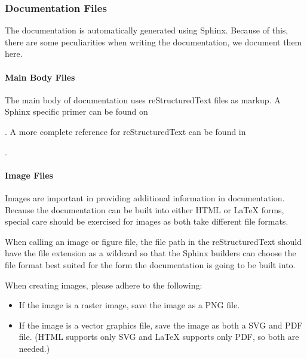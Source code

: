 \documentclass[letterpaper,11pt,english]{sphinxmanual}
\begin{document}
\subsubsection{Documentation Files}
\label{\detokenize{technical/conventions:documentation-files}}
\sphinxAtStartPar
The documentation is automatically generated using Sphinx. Because of this,
there are some peculiarities when writing the documentation, we document them
here.


\paragraph{Main Body Files}
\label{\detokenize{technical/conventions:main-body-files}}
\sphinxAtStartPar
The main body of documentation uses reStructuredText files as markup. A
Sphinx specific primer can be found on
%
\begin{footnote}[64]\sphinxAtStartFootnote
{}
%
\end{footnote}. A more complete reference for reStructuredText can be found in
%
\begin{footnote}[65]\sphinxAtStartFootnote
{}
%
\end{footnote}.


\paragraph{Image Files}
\label{\detokenize{technical/conventions:image-files}}
\sphinxAtStartPar
Images are important in providing additional information in documentation.
Because the documentation can be built into either HTML or LaTeX forms, special
care should be exercised for images as both take different file formats.

\sphinxAtStartPar
When calling an image or figure file, the file path in the reStructuredText
should have the file extension as a wildcard so that the Sphinx builders
can choose the file format best suited for the form the documentation is
going to be built into.

\sphinxAtStartPar
When creating images, please adhere to the following:
\begin{itemize}
\item {} 
\sphinxAtStartPar
If the image is a raster image, save the image as a PNG file.

\item {} 
\sphinxAtStartPar
If the image is a vector graphics file, save the image as both a SVG and PDF file. (HTML supports only SVG and LaTeX supports only PDF, so both are needed.)

\end{itemize}
\end{document}
